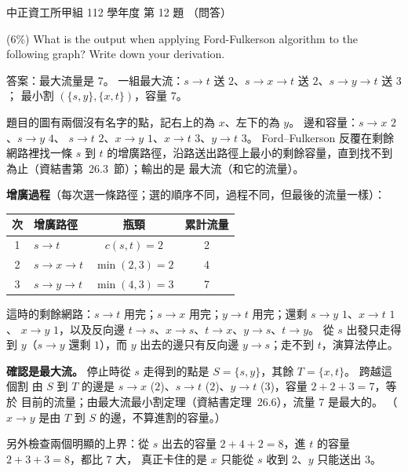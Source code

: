 \begin{pastexam}[label={px:ccu-112-swa-05}]{中正資工所甲組 112 學年度 第 12 題}
（問答）

(6\%) What is the output when applying Ford-Fulkerson algorithm to the following graph? Write down
your derivation.
\begin{center}
\end{center}
\end{pastexam}

\begin{pastsoln}
答案：最大流量是 $7$。 一組最大流：$s \to t$ 送 $2$、$s \to x \to t$ 送 $2$、$s \to y \to t$ 送 $3$；
最小割 $(\{s, y\}, \{x, t\})$，容量 $7$。

題目的圖有兩個沒有名字的點，記右上的為 $x$、左下的為 $y$。 邊和容量：$s \to x$ $2$、$s \to y$ $4$、
$s \to t$ $2$、$x \to y$ $1$、$x \to t$ $3$、$y \to t$ $3$。 Ford--Fulkerson 反覆在剩餘網路裡找一條
$s$ 到 $t$ 的增廣路徑，沿路送出路徑上最小的剩餘容量，直到找不到為止（資結書第~26.3~節）；輸出的是
最大流（和它的流量）。

\textbf{增廣過程}（每次選一條路徑；選的順序不同，過程不同，但最後的流量一樣）：
\begin{center}
\small
\begin{tabular}{clcc}
\toprule
次 & 增廣路徑 & 瓶頸 & 累計流量 \\
\midrule
1 & $s \to t$ & $c(s, t) = 2$ & 2 \\
2 & $s \to x \to t$ & $\min(2, 3) = 2$ & 4 \\
3 & $s \to y \to t$ & $\min(4, 3) = 3$ & 7 \\
\bottomrule
\end{tabular}
\end{center}
這時的剩餘網路：$s \to t$ 用完；$s \to x$ 用完；$y \to t$ 用完；還剩 $s \to y$ $1$、$x \to t$ $1$、
$x \to y$ $1$，以及反向邊 $t \to s$、$x \to s$、$t \to x$、$y \to s$、$t \to y$。 從 $s$ 出發只走得到
$y$（$s \to y$ 還剩 $1$），而 $y$ 出去的邊只有反向邊 $y \to s$；走不到 $t$，演算法停止。

\textbf{確認是最大流。} 停止時從 $s$ 走得到的點是 $S = \{s, y\}$，其餘 $T = \{x, t\}$。 跨越這個割
由 $S$ 到 $T$ 的邊是 $s \to x$ ($2$)、$s \to t$ ($2$)、$y \to t$ ($3$)，容量 $2 + 2 + 3 = 7$，等於
目前的流量；由最大流最小割定理（資結書定理~26.6），流量 $7$ 是最大的。 （$x \to y$ 是由 $T$ 到
$S$ 的邊，不算進割的容量。）

另外檢查兩個明顯的上界：從 $s$ 出去的容量 $2 + 4 + 2 = 8$，進 $t$ 的容量 $2 + 3 + 3 = 8$，都比 $7$ 大，
真正卡住的是 $x$ 只能從 $s$ 收到 $2$、$y$ 只能送出 $3$。
\end{pastsoln}
